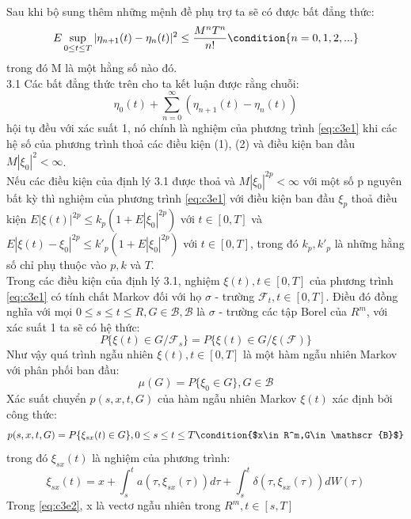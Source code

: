 \documentclass[14pt,a4paper]{article}
\numberwithin{equation}{section}
\begin{document}
Sau khi bộ sung thêm những mệnh đề phụ trợ ta sẽ có được bất đẳng thức:
\begin{equation*}
	E\sup_{0\leq t\leq T}|\eta_{n+1}(t)-\eta_n(t)|^2\leq\frac{M^nT^n}{n!} \condition{n=0,1,2,...}
\end{equation*}
trong đó M là một hằng số nào đó.\\3.1
Các bất đẳng thức trên cho ta kết luận được rằng chuỗi:
\begin{equation*}
	\eta_0(t)+\sum_{n=0}^\infty(\eta_{n+1}(t)-\eta_n(t))
\end{equation*}
hội tụ đều với xác suất 1, nó chính là nghiệm của phương trình \eqref{eq:c3e1} khi các hệ số của phương trình thoả các điều kiện (1), (2) và điều kiện ban đầu $M|\xi_0|^2<\infty$.\\
Nếu các điều kiện của định lý 3.1 được thoả và $M|\xi_0|^{2p}<\infty$ với một số p nguyên bất kỳ thì nghiệm của phương trình \eqref{eq:c3e1} với điều kiện ban đầu $\xi_p$ thoả điều kiện $E|\xi(t)|^{2p}\leq k_p(1+E|\xi_0|^{2p})$ với $t\in[0,T]$ và $E|\xi(t)-\xi_0|^{2p}\leq k'_p(1+E|\xi_0|^{2p})$ với $t\in[0,T]$, trong đó $k_p,k'_p$ là những hằng số chỉ phụ thuộc vào $p,k$ và $T$.\\
Trong các điều kiện của định lý 3.1, nghiệm $\xi(t),t\in[0,T]$ của phương trình \eqref{eq:c3e1} có tính chất Markov đối với họ $\sigma$ - trường ${\mathscr{F}_t,t\in[0,T]}$. Điều đó đồng nghĩa với mọi $0\leq s\leq t\leq R,G\in \mathscr{B},\mathscr{B}$ là $\sigma$ - trường các tập Borel của $R^m$, với xác suất 1 ta sẽ có hệ thức:
\begin{equation*}
	P\{\xi(t)\in G/\mathscr{F}_s\}=P\{\xi(t)\in G/\xi(\mathscr{F})\}
\end{equation*}
Như vậy quá trình ngẫu nhiên $\xi(t),t\in[0,T]$ là một hàm ngẫu nhiên Markov với phân phối ban đầu:
\begin{equation*}
	\mu(G)=P\{\xi_0\in G\},G\in \mathscr{B}
\end{equation*}
Xác suất chuyển $p(s,x,t,G)$ của hàm ngẫu nhiên Markov $\xi(t)$ xác định bởi công thức:
\begin{equation*}
	p(s,x,t,G)=P\{\xi_{sx}(t)\in G\},0\leq s\leq t\leq T \condition{$x\in R^m,G\in\mathscr{B}$}
\end{equation*}
trong đó $\xi_{sx}(t)$ là nghiệm của phương trình:
\begin{equation}\label{eq:c3e2}
	\xi_{sx}(t)=x+\int_{s}^{t}a(\tau,\xi_{sx}(\tau))d\tau+\int_{s}^{t}\delta(\tau,\xi_{sx}(\tau))dW(\tau)
\end{equation}
Trong \eqref{eq:c3e2}, x là vectơ ngẫu nhiên trong $R^m,t\in[s,T]$\\
\end{document}
